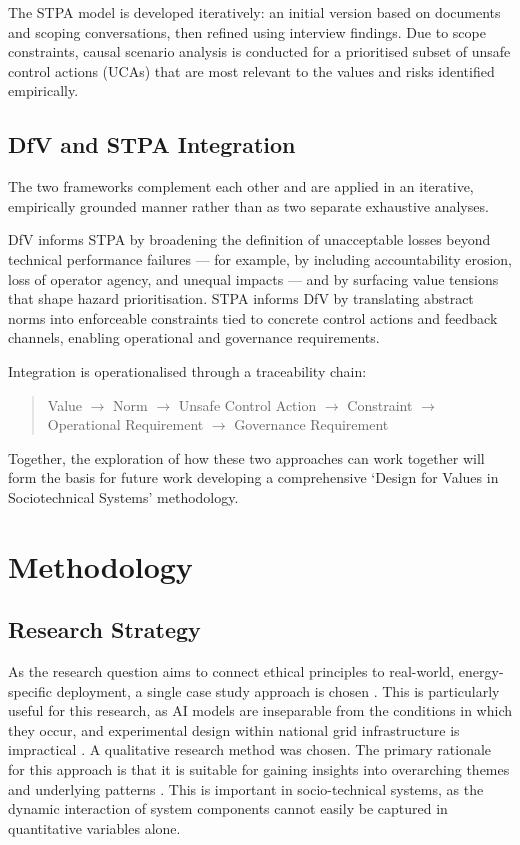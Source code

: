 The STPA model is developed iteratively: an initial version based on documents and scoping conversations, then refined using interview findings. Due to scope constraints, causal scenario analysis is conducted for a prioritised subset of unsafe control actions (UCAs) that are most relevant to the values and risks identified empirically.

\section{DfV and STPA Integration}
\label{sec:integration}

The two frameworks complement each other and are applied in an iterative, empirically grounded manner rather than as two separate exhaustive analyses.

DfV informs STPA by broadening the definition of unacceptable losses beyond technical performance failures — for example, by including accountability erosion, loss of operator agency, and unequal impacts — and by surfacing value tensions that shape hazard prioritisation. STPA informs DfV by translating abstract norms into enforceable constraints tied to concrete control actions and feedback channels, enabling operational and governance requirements.

Integration is operationalised through a traceability chain:

\begin{quote}
Value $\rightarrow$ Norm $\rightarrow$ Unsafe Control Action $\rightarrow$ Constraint $\rightarrow$ Operational Requirement $\rightarrow$ Governance Requirement
\end{quote}

Together, the exploration of how these two approaches can work together will form the basis for future work developing a comprehensive `Design for Values in Sociotechnical Systems' methodology.

\chapter{Methodology}
\label{ch:methodology}

\section{Research Strategy}
\label{sec:strategy}

As the research question aims to connect ethical principles to real-world, energy-specific deployment, a single case study approach is chosen \autocite{Crowe2011}. This is particularly useful for this research, as AI models are inseparable from the conditions in which they occur, and experimental design within national grid infrastructure is impractical \autocite{Baxter2015}. A qualitative research method was chosen. The primary rationale for this approach is that it is suitable for gaining insights into overarching themes and underlying patterns \autocite{Almeida2017}. This is important in socio-technical systems, as the dynamic interaction of system components cannot easily be captured in quantitative variables alone.

